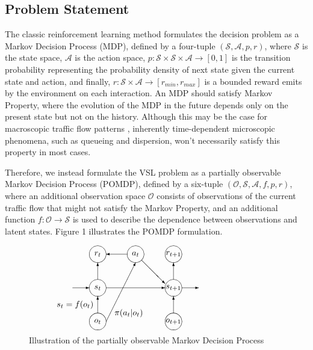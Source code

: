 \documentclass[11pt, letterpaper]{article}
\begin{document}
\subsection{Problem Statement}

The classic reinforcement learning method formulates the decision problem as a Markov Decision Process (MDP), defined by a four-tuple $\left(\mathcal{S}, \mathcal{A}, p, r\right)$, where $\mathcal{S}$ is the state space, $\mathcal{A}$ is the action space, $p:\mathcal{S}\times\mathcal{S}\times\mathcal{A}\rightarrow\left[0, 1\right]$ is the transition probability representing the probability density of next state given the current state and action, and finally, $r:\mathcal{S}\times\mathcal{A}\rightarrow\left[r_{min},r_{max}\right]$ is a bounded reward emits by the environment on each interaction. An MDP should satisfy Markov Property, where the evolution of the MDP in the future depends only on the present state but not on the history. Although this may be the case for macroscopic traffic flow patterns \citep{shi_research_2016}, inherently time-dependent microscopic phenomena, such as queueing and dispersion, won't necessarily satisfy this property in most cases.

Therefore, we instead formulate the VSL problem as a partially observable Markov Decision Process (POMDP), defined by a six-tuple $\left(\mathcal{O}, \mathcal{S}, \mathcal{A}, f, p, r\right)$, where an additional observation space $\mathcal{O}$ consists of observations of the current traffic flow that might not satisfy the Markov Property, and an additional function $f:\mathcal{O}\rightarrow\mathcal{S}$ is used to describe the dependence between observations and latent states. Figure 1 illustrates the POMDP formulation.
\begin{figure}[htbp]
	\centering
	\[\begin{picture}(100, 90) 
		\put(-50, 40){\vector(1, 0){20}}
		\put(-20, 40){\makebox(0, 0)[c]{$s_t$}}
		\put(-20, 40){\circle{20}}
		\put(-10, 40){\vector(1, 0){70}}
		\put(70, 40){\makebox(0, 0)[c]{$s_{t+1}$}}
		\put(70, 40){\circle{20}}
		\put(80, 40){\vector(1, 0){20}}

		\put(-20, 0){\makebox(0, 0)[c]{$o_t$}}
		\put(-20, 0){\circle{20}}
		\put(-20, 10){\vector(0, 1){20}}
		\put(70, 0){\makebox(0, 0)[c]{$o_{t+1}$}}
		\put(70, 0){\circle{20}}
		\put(70, 10){\vector(0, 1){20}}

		\put(-20, 80){\makebox(0, 0)[c]{$r_t$}}
		\put(-20, 80){\circle{20}}
		\put(-20, 50){\vector(0, 1){20}}
		\put(70, 80){\makebox(0, 0)[c]{$r_{t+1}$}}
		\put(70, 80){\circle{20}}
		\put(70, 50){\vector(0, 1){20}}

		\put(25, 80){\makebox(0, 0)[c]{$a_t$}}
		\put(25, 80){\circle{20}}
		\put(15, 80){\vector(-1, 0){25}}
		\put(32, 73){\vector(1, -1){28}}
		\put(-10, 0){\vector(1, 2){35}}

		\put(-25, 20){\makebox(0, 0)[r]{$s_t=f(o_t)$}}
		\put(0, 10){\makebox(0, 0)[l]{$\pi(a_t|o_t)$}}
	\end{picture}\]
	\caption{Illustration of the partially observable Markov Decision Process}
	\label{}
\end{figure}
\end{document}
